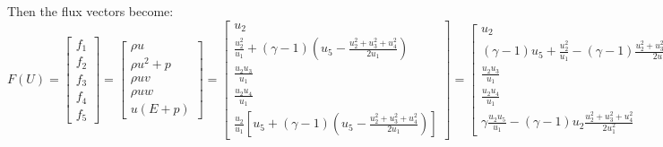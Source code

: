 \documentclass{article}
\begin{document}
Then the flux vectors become:
\begin{equation}
  F(U) = \left[
    \begin{array}{c}
      f_1 \\
      f_2 \\
      f_3 \\
      f_4 \\
      f_5
    \end{array}
  \right] = \left[
    \begin{array}{c}
      \rho u\\
      \rho u^2 + p\\
      \rho u v\\
      \rho u w\\
      u(E+p)
    \end{array}
  \right] = \left[
    \begin{array}{c}
      u_2\\
      \frac{u_2^2}{u_1} + (\gamma-1) (u_5-\frac{u_2^2+u_3^2+u_4^2}{2u_1})\\
      \frac{u_2 u_3}{u_1}\\
      \frac{u_2 u_4}{u_1}\\
      \frac{u_2}{u_1} [ u_5 + (\gamma-1)(u_5-\frac{u_2^2+u_3^2+u_4^2}{2u_1}) ]
    \end{array}
  \right] = \left[
    \begin{array}{c}
      u_2\\
      (\gamma-1)u_5 + \frac{u_2^2}{u_1} - (\gamma-1)\frac{u_2^2+u_3^2+u_4^2}{2u_1}\\
      \frac{u_2 u_3}{u_1}\\
      \frac{u_2 u_4}{u_1}\\
      \gamma \frac{u_2 u_5}{u_1} - (\gamma-1) u_2 \frac{u_2^2+u_3^2+u_4^2}{2 u_1^2}
    \end{array}
  \right]
\end{equation}
\end{document}
